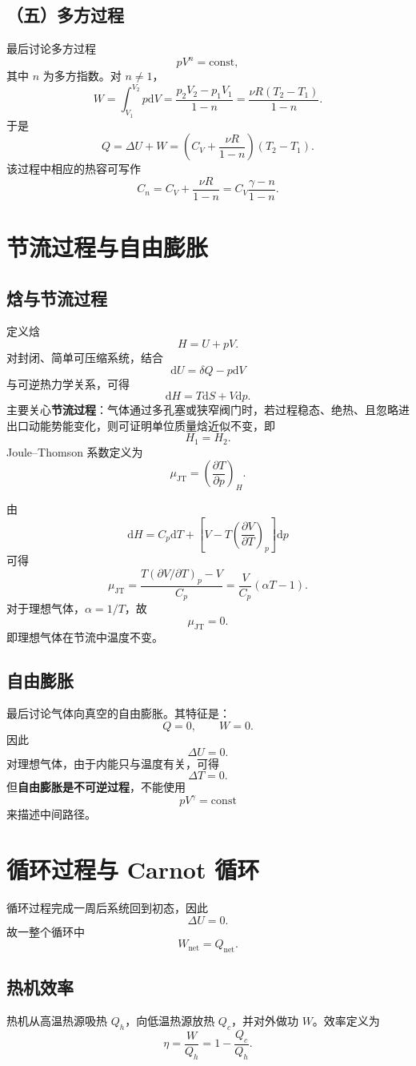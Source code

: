 \documentclass[11pt,a4paper,openany]{ctexbook}
\newcommand{\dd}{\mathrm d}
\newcommand{\pp}[2]{\frac{\partial #1}{\partial #2}}
\newcommand{\const}{\mathrm{const}}
\begin{document}
\subsection*{（五）多方过程}
最后讨论多方过程
\[
\boxed{pV^n=\const},
\]
其中 $n$ 为多方指数。对 $n\neq1$，
\[
W=\int_{V_1}^{V_2}p\dd V
=
\frac{p_2V_2-p_1V_1}{1-n}
=
\frac{\nu R(T_2-T_1)}{1-n}.
\]
于是
\[
Q=\Delta U+W
=
\left(C_V+\frac{\nu R}{1-n}\right)(T_2-T_1).
\]
该过程中相应的热容可写作
\[
C_n=C_V+\frac{\nu R}{1-n}
=
C_V\frac{\gamma-n}{1-n}.
\]

\section{节流过程与自由膨胀}


\subsection*{焓与节流过程}
定义焓
\[
\boxed{H=U+pV}.
\]
对封闭、简单可压缩系统，结合
\[
\dd U=\delta Q-p\dd V
\]
与可逆热力学关系，可得
\[
\dd H=T\dd S+V\dd p.
\]
主要关心\textbf{节流过程}：气体通过多孔塞或狭窄阀门时，若过程稳态、绝热、且忽略进出口动能势能变化，则可证明单位质量焓近似不变，即
\[
\boxed{H_1=H_2}.
\]
Joule--Thomson 系数定义为
\[
\mu_{\mathrm{JT}}=
\left(\pp Tp\right)_H.
\]

由
\[
\dd H=C_p\dd T+\left[V-T\left(\pp VT\right)_p\right]\dd p
\]
可得
\[
\boxed{
\mu_{\mathrm{JT}}
=
\frac{T(\partial V/\partial T)_p-V}{C_p}
=
\frac{V}{C_p}(\alpha T-1)
}.
\]
对于理想气体，$\alpha=1/T$，故
\[
\mu_{\mathrm{JT}}=0.
\]
即理想气体在节流中温度不变。

\subsection*{自由膨胀}
最后讨论气体向真空的自由膨胀。其特征是：
\[
Q=0,\qquad W=0.
\]
因此
\[
\Delta U=0.
\]
对理想气体，由于内能只与温度有关，可得
\[
\Delta T=0.
\]
但\textbf{自由膨胀是不可逆过程}，不能使用
\[
pV^\gamma=\const
\]
来描述中间路径。

\section{循环过程与 Carnot 循环}
循环过程完成一周后系统回到初态，因此
\[
\Delta U=0.
\]
故一整个循环中
\[
W_{\mathrm{net}}=Q_{\mathrm{net}}.
\]

\subsection*{热机效率}
热机从高温热源吸热 $Q_h$，向低温热源放热 $Q_c$，并对外做功 $W$。效率定义为
\[
\boxed{\eta=\frac{W}{Q_h}=1-\frac{Q_c}{Q_h}}.
\]
\end{document}
